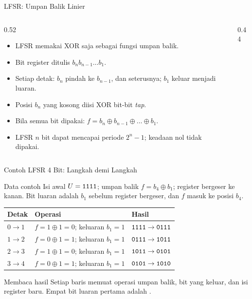 \documentclass[aspectratio=169,11pt]{beamer}
\begin{document}
\begin{frame}{LFSR: Umpan Balik Linier}
    \footnotesize
    \begin{columns}[T,onlytextwidth]
        \begin{column}{0.52\textwidth}
            \begin{itemize}
                \item LFSR memakai XOR saja sebagai fungsi umpan balik.
                \item Bit register ditulis $b_n b_{n-1}\dots b_1$.
                \item Setiap detak: $b_n$ pindah ke $b_{n-1}$, dan seterusnya;
                      $b_1$ keluar menjadi luaran.
                \item Posisi $b_n$ yang kosong diisi XOR bit-bit \textit{tap}.
                \item Bila semua bit dipakai:
                      $f=b_n\oplus b_{n-1}\oplus\dots\oplus b_1$.
                \item LFSR $n$ bit dapat mencapai periode $2^n-1$; keadaan
                      nol tidak dipakai.
            \end{itemize}
        \end{column}
        \begin{column}{0.44\textwidth}
            \centering
        \end{column}
    \end{columns}
\end{frame}

\begin{frame}{Contoh LFSR 4 Bit: Langkah demi Langkah}
    \footnotesize
    \begin{block}{Data contoh}
        Isi awal $U=\texttt{1111}$; umpan balik $f=b_4\oplus b_1$; register
        bergeser ke kanan. Bit luaran adalah $b_1$ sebelum register
        bergeser, dan $f$ masuk ke posisi $b_4$.
    \end{block}
    \vspace{0.1cm}
    \begin{tabular}{@{}l@{\quad}l@{\quad}l@{}}
        \toprule
        Detak & Operasi & Hasil \\
        \midrule
        $0\to1$ & $f=1\oplus1=0$; keluaran $b_1=1$ & $\texttt{1111}\to\texttt{0111}$ \\
        $1\to2$ & $f=0\oplus1=1$; keluaran $b_1=1$ & $\texttt{0111}\to\texttt{1011}$ \\
        $2\to3$ & $f=1\oplus1=0$; keluaran $b_1=1$ & $\texttt{1011}\to\texttt{0101}$ \\
        $3\to4$ & $f=0\oplus1=1$; keluaran $b_1=1$ & $\texttt{0101}\to\texttt{1010}$ \\
        \bottomrule
    \end{tabular}
    \vspace{0.15cm}
    \begin{exampleblock}{Membaca hasil}
        Setiap baris memuat operasi umpan balik, bit yang keluar, dan isi
        register baru. Empat bit luaran pertama adalah .
    \end{exampleblock}
\end{frame}
\end{document}
